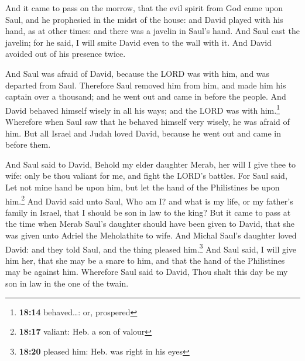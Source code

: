  And it came to pass on the morrow, that the evil spirit
from God came upon Saul, and he prophesied in the midst of the house:
and David played with his hand, as at other times: and there was a
javelin in Saul's hand.  And Saul cast the javelin; for
he said, I will smite David even to the wall with it. And David avoided
out of his presence twice.

 And Saul was afraid of David, because the LORD was with
him, and was departed from Saul.  Therefore Saul removed
him from him, and made him his captain over a thousand; and he went out
and came in before the people.  And David behaved himself
wisely in all his ways; and the LORD was with him.\footnote{\textbf{18:14}
  behaved\ldots: or, prospered}  Wherefore when Saul saw
that he behaved himself very wisely, he was afraid of him.
 But all Israel and Judah loved David, because he went
out and came in before them.

 And Saul said to David, Behold my elder daughter Merab,
her will I give thee to wife: only be thou valiant for me, and fight the
LORD's battles. For Saul said, Let not mine hand be upon him, but let
the hand of the Philistines be upon him.\footnote{\textbf{18:17}
  valiant: Heb. a son of valour}  And David said unto
Saul, Who am I? and what is my life, or my father's family in Israel,
that I should be son in law to the king?  But it came to
pass at the time when Merab Saul's daughter should have been given to
David, that she was given unto Adriel the Meholathite to wife.
 And Michal Saul's daughter loved David: and they told
Saul, and the thing pleased him.\footnote{\textbf{18:20} pleased him:
  Heb. was right in his eyes}  And Saul said, I will give
him her, that she may be a snare to him, and that the hand of the
Philistines may be against him. Wherefore Saul said to David, Thou shalt
this day be my son in law in the one of the twain.

